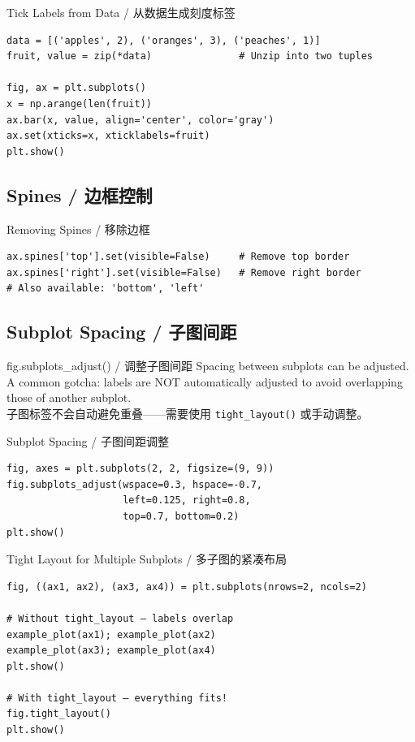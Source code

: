 \documentclass[11pt,a4paper]{report}
\let\oldtexttt\texttt
\renewcommand{\texttt}[1]{\textcolor{mainblue}{\oldtexttt{#1}}}
\begin{document}
\begin{examplebox}{Tick Labels from Data / 从数据生成刻度标签}
\begin{lstlisting}
data = [('apples', 2), ('oranges', 3), ('peaches', 1)]
fruit, value = zip(*data)               # Unzip into two tuples

fig, ax = plt.subplots()
x = np.arange(len(fruit))
ax.bar(x, value, align='center', color='gray')
ax.set(xticks=x, xticklabels=fruit)
plt.show()
\end{lstlisting}
\end{examplebox}

\subsection{Spines / 边框控制}

\begin{examplebox}{Removing Spines / 移除边框}
\begin{lstlisting}
ax.spines['top'].set(visible=False)     # Remove top border
ax.spines['right'].set(visible=False)   # Remove right border
# Also available: 'bottom', 'left'
\end{lstlisting}
\end{examplebox}

\subsection{Subplot Spacing / 子图间距}

\begin{concept}{fig.subplots\_adjust() / 调整子图间距}
    Spacing between subplots can be adjusted. A common gotcha: labels are NOT automatically adjusted to avoid overlapping those of another subplot. \\
    子图标签不会自动避免重叠——需要使用 \texttt{tight\_layout()} 或手动调整。
\end{concept}

\begin{examplebox}{Subplot Spacing / 子图间距调整}
\begin{lstlisting}
fig, axes = plt.subplots(2, 2, figsize=(9, 9))
fig.subplots_adjust(wspace=0.3, hspace=-0.7,
                    left=0.125, right=0.8,
                    top=0.7, bottom=0.2)
plt.show()
\end{lstlisting}
\end{examplebox}

\begin{examplebox}{Tight Layout for Multiple Subplots / 多子图的紧凑布局}
\begin{lstlisting}
fig, ((ax1, ax2), (ax3, ax4)) = plt.subplots(nrows=2, ncols=2)

# Without tight_layout — labels overlap
example_plot(ax1); example_plot(ax2)
example_plot(ax3); example_plot(ax4)
plt.show()

# With tight_layout — everything fits!
fig.tight_layout()
plt.show()
\end{lstlisting}
\end{examplebox}
\end{document}
